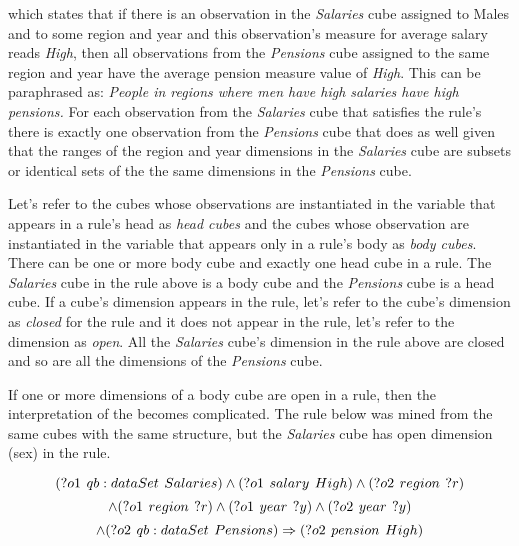 which states that if there is an observation in the \textit{Salaries} cube assigned to Males and to some region and year and this observation's measure for average salary reads \textit{High}, then all observations from the \textit{Pensions} cube assigned to the same region and year have the average pension measure value of \textit{High}. This can be paraphrased as: \textit{People in regions where men have high salaries have high pensions.} For each observation from the \textit{Salaries} cube that satisfies the rule's there is exactly one observation from the \textit{Pensions} cube that does as well given that the ranges of the region and year dimensions in the \textit{Salaries} cube are subsets or identical sets of the the same dimensions in the \textit{Pensions} cube. 

Let's refer to the cubes whose observations are instantiated in the variable that appears in a rule's head as \textit{head cubes} and the cubes whose observation are instantiated in the variable that appears only in a rule's body as \textit{body cubes}. There can be one or more body cube and exactly one head cube in a rule. The \textit{Salaries} cube in the rule above is a body cube and the \textit{Pensions} cube is a head cube. If a cube's dimension appears in the rule, let's refer to the cube's dimension as \textit{closed} for the rule and it does not appear in the rule, let's refer to the dimension as \textit{open}. All the \textit{Salaries} cube's dimension in the rule above are closed and so are all the dimensions of the \textit{Pensions} cube.

If one or more dimensions of a body cube are open in a rule, then the interpretation of the becomes complicated. The rule below was mined from the same cubes with the same structure, but the \textit{Salaries} cube has open dimension (sex) in the rule.

$$
(?o1\hspace{0.4em}qb:dataSet\hspace{0.4em}Salaries) \land (?o1\hspace{0.4em}salary\hspace{0.4em}High) \land (?o2\hspace{0.4em}region\hspace{0.4em}?r)
$$
$$
\land (?o1\hspace{0.4em}region\hspace{0.4em}?r) \land (?o1\hspace{0.4em}year\hspace{0.4em}?y) \land (?o2\hspace{0.4em}year\hspace{0.4em}?y)
$$
$$
\land (?o2\hspace{0.4em}qb:dataSet\hspace{0.4em}Pensions) \Rightarrow (?o2\hspace{0.4em}pension\hspace{0.4em}High)
$$

